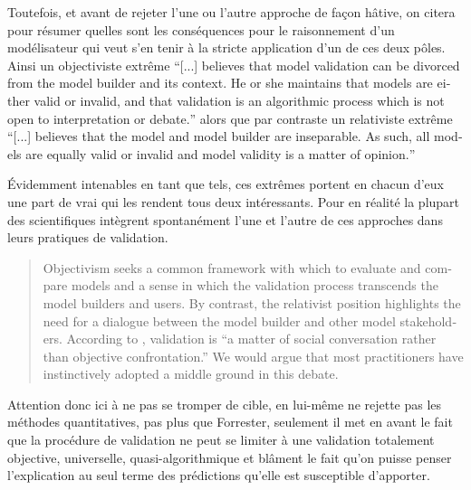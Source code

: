 

Toutefois, et avant de rejeter l'une ou l'autre approche de façon hâtive, on citera \textcite{Kleindorfer1998} pour résumer quelles sont les conséquences pour le raisonnement d'un modélisateur qui veut s'en tenir à la stricte application d'un de ces deux pôles. Ainsi un objectiviste extrême \foreignquote{english}{[...] believes that model validation can be divorced from the model builder and its context. He or she maintains that models are either valid or invalid, and that validation is an algorithmic process which is not open to interpretation or debate.} alors que par contraste un relativiste extrême \foreignquote{english}{[...] believes that the model and model builder are inseparable. As such, all models are equally valid or invalid and model validity is a matter of opinion.}

Évidemment intenables en tant que tels, ces extrêmes portent en chacun d'eux une part de vrai qui les rendent tous deux intéressants. Pour \textcite{Kleindorfer1998} en réalité la plupart des scientifiques intègrent spontanément l'une et l'autre de ces approches dans leurs pratiques de validation.

\foreignblockquote{english}[{\cite[1098]{Kleindorfer1998}}]{Objectivism seeks a common framework with which to evaluate and compare models and a sense in which the validation process transcends the model builders and users. By contrast, the relativist position highlights the need for a dialogue between the model builder and other model stakeholders. According to \autocite{Barlas1990}, validation is \enquote{a matter of social conversation rather than objective confrontation.} We would argue that most practitioners have instinctively adopted a middle ground in this debate.} 

Attention donc ici à ne pas se tromper de cible, \textcite[188]{Barlas1996} en lui-même ne rejette pas les méthodes quantitatives, pas plus que Forrester, seulement il met en avant le fait que la procédure de validation ne peut se limiter à une validation totalement objective, universelle, quasi-algorithmique et blâment le fait qu'on puisse penser l'explication au seul terme des prédictions qu'elle est susceptible d'apporter.

